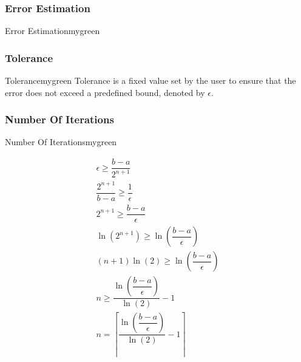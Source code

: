 \vspace{0.25cm}
\subsubsection{Error Estimation}
\begin{prettyBox}{Error Estimation}{mygreen}
\begin{center}
\end{center}
\end{prettyBox}

\vspace{0.15cm}

\subsubsection{Tolerance}
\begin{prettyBox}{Tolerance}{mygreen}
Tolerance is a fixed value set by the user to ensure that the error does not exceed a predefined bound, denoted by \(\epsilon\).
\begin{center}
\end{center}
\end{prettyBox}

\vspace{0.15cm}


\subsubsection{Number Of Iterations}
\begin{prettyBox}{Number Of Iterations}{mygreen}
    
    \begin{center}
    \[
    \begin{gathered}
        \epsilon \geq \dfrac{b-a}{2^{n+1}} \\[0.3cm]
        \dfrac{2^{n+1}}{b-a} \geq \dfrac{1}{\epsilon} \\[0.3cm]
        2^{n+1} \geq \dfrac{b-a}{\epsilon} \\[0.3cm]
        \ln(2^{n+1}) \geq \ln\left(\dfrac{b-a}{\epsilon}\right) \\[0.3cm]
        (n+1) \ln(2) \geq \ln\left(\dfrac{b-a}{\epsilon}\right) \\[0.3cm]
        n \geq \dfrac{\ln\left(\dfrac{b-a}{\epsilon}\right)}{\ln(2)} - 1 \\[0.3cm]
        \boxed{n = \left\lceil \dfrac{\ln\left(\dfrac{b-a}{\epsilon}\right)}{\ln(2)} - 1 \right\rceil}
    \end{gathered}
    \]
    \end{center}
\end{prettyBox}
\vspace{0.25cm}

